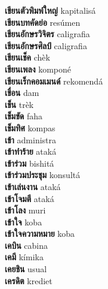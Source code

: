 \textbf{ เขียนตัวพิมพ์ใหญ่  } kapitalisá \\
\textbf{ เขียนบทคัดย่อ  } resúmen \\
\textbf{ เขียนอักษรวิจิตร  } caligrafia \\
\textbf{ เขียนอักษรศิลป์  } caligrafia \\
\textbf{ เขียนเช็ค  } chèk \\
\textbf{ เขียนเพลง  } komponé \\
\textbf{ เขียนเร็กคอมเมนด์  } rekomendá \\
\textbf{ เขื่อน  } dam \\
\textbf{ เข็น  } trèk \\
\textbf{ เข็มขัด  } faha \\
\textbf{ เข็มทิศ  } kompas \\
\textbf{ เข้า  } administra \\
\textbf{ เข้าทำร้าย  } ataká \\
\textbf{ เข้าร่วม  } bishitá \\
\textbf{ เข้าร่วมประชุม  } konsultá \\
\textbf{ เข้าเล่นงาน  } ataká \\
\textbf{ เข้าโจมตี  } ataká \\
\textbf{ เข้าโลง  } muri \\
\textbf{ เข้าใจ  } koba \\
\textbf{ เข้าใจความหมาย  } koba \\
\textbf{ เคบิน  } cabina \\
\textbf{ เคมี  } kímika \\
\textbf{ เคยชิน  } usual \\
\textbf{ เครดิต  } krediet \\
